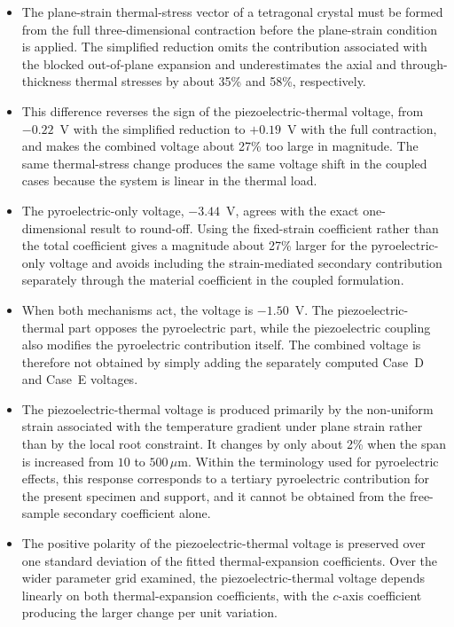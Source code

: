 \documentclass[a4paper, 11pt, twoside]{article}
\begin{document}
\begin{itemize}
\item The plane-strain thermal-stress vector of a tetragonal crystal must be formed
from the full three-dimensional contraction before the plane-strain condition is
applied. The simplified reduction omits the contribution associated with the blocked
out-of-plane expansion and underestimates the axial and through-thickness thermal
stresses by about 35\% and 58\%, respectively.

\item This difference reverses the sign of the piezoelectric-thermal voltage, from
$-0.22$~V with the simplified reduction to $+0.19$~V with the full contraction, and
makes the combined voltage about 27\% too large in magnitude. The same thermal-stress
change produces the same voltage shift in the coupled cases because the system is
linear in the thermal load.

\item The pyroelectric-only voltage, $-3.44$~V, agrees with the exact one-dimensional
result to round-off. Using the fixed-strain coefficient rather than the total
coefficient gives a magnitude about 27\% larger for the pyroelectric-only voltage and
avoids including the strain-mediated secondary contribution separately through the
material coefficient in the coupled formulation.

\item When both mechanisms act, the voltage is $-1.50$~V. The piezoelectric-thermal
part opposes the pyroelectric part, while the piezoelectric coupling also modifies the
pyroelectric contribution itself. The combined voltage is therefore not obtained by
simply adding the separately computed Case~D and Case~E voltages.

\item The piezoelectric-thermal voltage is produced primarily by the non-uniform strain
associated with the temperature gradient under plane strain rather than by the local
root constraint. It changes by only about 2\% when the span is increased from
$10$ to $500\,\mu\text{m}$. Within the terminology used for pyroelectric effects, this
response corresponds to a tertiary pyroelectric contribution for the present specimen
and support, and it cannot be obtained from the free-sample secondary coefficient
alone.

\item The positive polarity of the piezoelectric-thermal voltage is preserved over one
standard deviation of the fitted thermal-expansion coefficients. Over the wider parameter grid examined, the piezoelectric-thermal voltage depends
linearly on both thermal-expansion coefficients, with the $c$-axis coefficient
producing the larger change per unit variation.
\end{itemize}
\end{document}
